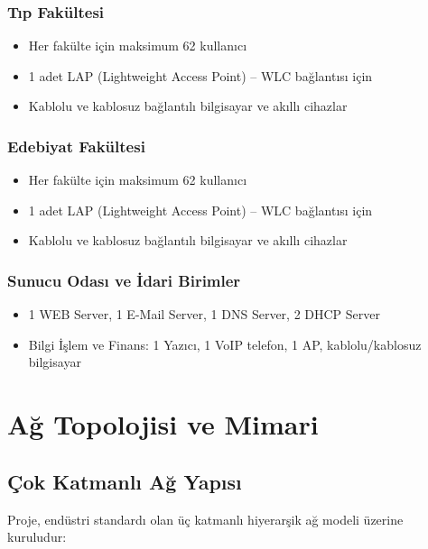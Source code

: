 \documentclass[12pt,a4paper]{article}
\begin{document}
\subsubsection{Tıp Fakültesi}
\begin{itemize}[noitemsep]
  \item Her fakülte için maksimum 62 kullanıcı
  \item 1 adet LAP (Lightweight Access Point) -- WLC bağlantısı için
  \item Kablolu ve kablosuz bağlantılı bilgisayar ve akıllı cihazlar
\end{itemize}

\subsubsection{Edebiyat Fakültesi}
\begin{itemize}[noitemsep]
  \item Her fakülte için maksimum 62 kullanıcı
  \item 1 adet LAP (Lightweight Access Point) -- WLC bağlantısı için
  \item Kablolu ve kablosuz bağlantılı bilgisayar ve akıllı cihazlar
\end{itemize}

\subsubsection{Sunucu Odası ve İdari Birimler}
\begin{itemize}[noitemsep]
  \item 1 WEB Server, 1 E-Mail Server, 1 DNS Server, 2 DHCP Server
  \item Bilgi İşlem ve Finans: 1 Yazıcı, 1 VoIP telefon, 1 AP, kablolu/kablosuz bilgisayar
\end{itemize}

\newpage
\section{Ağ Topolojisi ve Mimari}

\subsection{Çok Katmanlı Ağ Yapısı}

Proje, endüstri standardı olan üç katmanlı hiyerarşik ağ modeli üzerine kuruludur:
\end{document}
